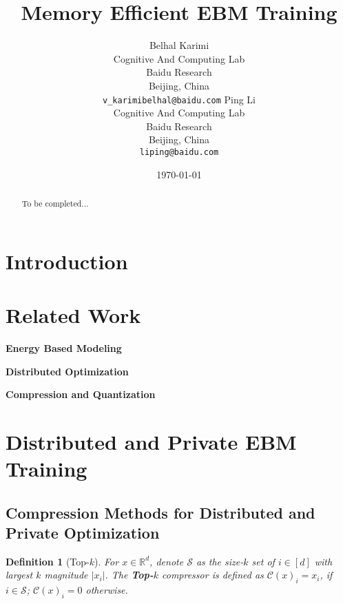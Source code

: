 \documentclass[11pt]{article}
\newtheorem{definition}{Definition}
\begin{document}
\title{Memory Efficient EBM Training}

\author{
  Belhal Karimi \\
  Cognitive And Computing Lab\\
  Baidu Research\\
  Beijing, China \\
  \texttt{v_karimibelhal@baidu.com} 
   \And
  Ping Li \\
  Cognitive And Computing Lab\\
  Baidu Research\\
  Beijing, China \\
  \texttt{liping@baidu.com} \\
}

\date{\today}

\maketitle

\begin{abstract}
To be completed...
\end{abstract}

\section{Introduction}\label{sec:introduction}




\section{Related Work}\label{sec:related}

\textbf{Energy Based Modeling} 

\textbf{Distributed Optimization} 

\textbf{Compression and Quantization} 




\section{Distributed and Private EBM Training}



\subsection{Compression Methods for Distributed and Private Optimization}

\begin{definition}[Top-$k$]\label{def:topk}
For $x\in\mathbb R^d$, denote $\mathcal S$ as the size-$k$ set of $i\in[d]$ with largest $k$ magnitude $|x_i|$. The \textbf{Top-$k$} compressor is defined as $\mathcal C(x)_i=x_i$, if $i\in\mathcal S$; $\mathcal C(x)_i=0$ otherwise.
\end{definition}
\end{document}
